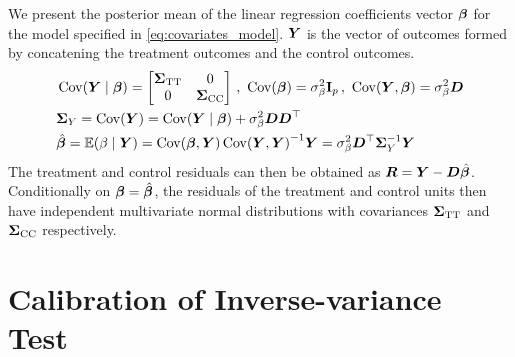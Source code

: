 \documentclass[12pt]{article}
\begin{document}
\begin{appendices}
We present the posterior mean of the linear regression coefficients vector \(\bm{\beta}\) for the model specified in \autoref{eq:covariates_model}. \(\bm{Y}\) is the vector of outcomes formed by concatening the treatment outcomes and the control outcomes.
\begin{equation}
    \begin{split}
        &
        \cov\del{\Yvec \mid \betavec }
                = \begin{bmatrix}
                    \STT & 0 \\
                    0 & \SCC
                  \end{bmatrix}
            \,,\ 
            \cov\del{\betavec} = \sigmabeta^2 \eye_p 
            \,,\  
            \cov\del{\Yvec, \betavec} = \sigmabeta^2 \Dmat \\&
        \SigmaMat_Y = \cov\del{\Yvec} 
            = \cov\del{\Yvec \mid \betavec}
                + \sigmabeta^2 \Dmat \Dmat\trans \\&
        \hat\betavec 
            = \E\del{\beta \mid \Yvec} 
            = \cov\del{\betavec,\Yvec} \cov\del{\Yvec,\Yvec}^{-1} \Yvec
            = \sigmabeta^2 \Dmat\trans\SigmaMat_{Y}^{-1} \Yvec
    \end{split}
\end{equation}
The treatment and control residuals can then be obtained as \(\bm{R} = \bm{Y} - \bm{D} \hat{\bm{\beta}}\).
Conditionally on \(\bm{\beta}=\hat{\bm{\beta}}\), the residuals of the treatment and control units then have independent multivariate normal distributions with covariances $\bm{\Sigma}_{\mathrm{T} \mathrm{T}}$ and $\bm{\Sigma}_{\mathrm{C} \mathrm{C}}$ respectively.


\section{Calibration of Inverse-variance Test}
\label{sec:calibration}


\end{appendices}
\end{document}
